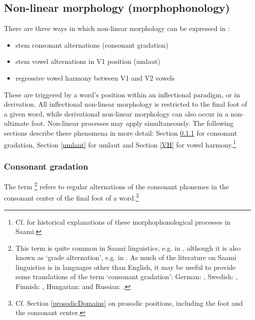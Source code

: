 \subsection{Non-linear morphology (morphophonology)}\label{morphophonology}
There are three ways %
in which non-linear morphology can be expressed in \PS:
\begin{itemize}
\item{stem consonant alternations (consonant gradation)}
\item{stem vowel alternations in V1 position (umlaut)}
\item{regressive vowel harmony between V1 and V2 vowels}
\end{itemize}
These are triggered by a word’s position %
within an inflectional paradigm, or in derivation. All inflectional non-linear morphology is restricted to the final foot of a given word, while derivational non-linear morphology can also occur in a non-ultimate foot. Non-linear processes may apply simultaneously. The following sections describe these phenomena in more detail: Section \ref{Cgrad} for consonant gradation, Section \ref{umlaut} for umlaut and Section \ref{VH} for vowel harmony.\footnote{Cf. \citet{Korhonen1969} for historical explanations of these morphophonological processes in Saami.} 


\subsubsection{Consonant gradation}\label{Cgrad}
The term \footnote{This term is quite common in Saami linguistics, e.g. in \citet{Feist2010}, although it is also known as ‘grade alternation’, e.g. in \citet{Sammallahti1998}. As much of the literature on Saami linguistics is in languages other than English, it may be useful to provide some translations of the term ‘consonant gradation’: German: , Swedish: , Finnish: , Hungarian:  and Russian: .} 
refers to regular alternations of the consonant phonemes in the consonant center of the final foot of a word.\footnote{Cf. Section \ref{prosodicDomains} on prosodic positions, including the foot and the consonant center.} 


